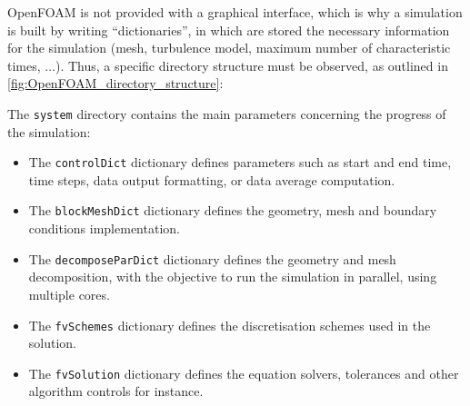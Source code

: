 \documentclass[12pt,twoside]{report}
\newcommand\fname[2]{#1}
\begin{document}
OpenFOAM is not provided with a graphical interface, which is why a simulation is built by writing ``dictionaries'', in which are stored the necessary information for the simulation (mesh, turbulence model, maximum number of characteristic times, $\dots$). Thus, a specific directory structure must be observed, as outlined in \autoref{fig:OpenFOAM_directory_structure}:
\begin{center}
\label{fig:OpenFOAM_directory_structure}
\end{center}

The \texttt{system} directory contains the main parameters concerning the progress of the simulation:
\begin{itemize}
    \item[$-$] The \texttt{controlDict} dictionary defines parameters such as start and end time, time steps, data output formatting, or data average computation.
    \item[$-$] The \texttt{blockMeshDict} dictionary defines the geometry, mesh and boundary conditions implementation.
    \item[$-$] The \texttt{decomposeParDict} dictionary defines the geometry and mesh decomposition, with the objective to run the simulation in parallel, using multiple cores.
    \item[$-$] The \texttt{fvSchemes} dictionary defines the discretisation schemes used in the solution.
    \item[$-$] The \texttt{fvSolution} dictionary defines the equation solvers, tolerances and other algorithm controls for instance. 
\end{itemize}
\end{document}
